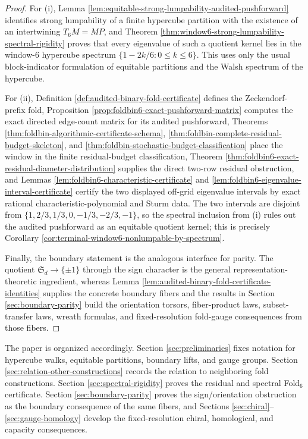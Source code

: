 \documentclass[12pt,a4paper]{article}
\theoremstyle{plain}
\theoremstyle{definition}
\numberwithin{equation}{section}
\begin{document}
\begin{proof}
For \textup{(i)}, Lemma \ref{lem:equitable-strong-lumpability-audited-pushforward} identifies strong lumpability of a finite hypercube partition with the existence of an intertwining \(T_6M=MP\), and Theorem \ref{thm:window6-strong-lumpability-spectral-rigidity} proves that every eigenvalue of such a quotient kernel lies in the window-\(6\) hypercube spectrum \(\{1-2k/6:0\le k\le6\}\).  This uses only the usual block-indicator formulation of equitable partitions and the Walsh spectrum of the hypercube.

For \textup{(ii)}, Definition \ref{def:audited-binary-fold-certificate} defines the Zeckendorf-prefix fold, Proposition \ref{prop:foldbin6-exact-pushforward-matrix} computes the exact directed edge-count matrix for its audited pushforward, Theorems \ref{thm:foldbin-algorithmic-certificate-schema}, \ref{thm:foldbin-complete-residual-budget-skeleton}, and \ref{thm:foldbin-stochastic-budget-classification} place the window in the finite residual-budget classification, Theorem \ref{thm:foldbin6-exact-residual-diameter-distribution} supplies the direct two-row residual obstruction, and Lemmas \ref{lem:foldbin6-characteristic-certificate} and \ref{lem:foldbin6-eigenvalue-interval-certificate} certify the two displayed off-grid eigenvalue intervals by exact rational characteristic-polynomial and Sturm data.  The two intervals are disjoint from \(\{1,2/3,1/3,0,-1/3,-2/3,-1\}\), so the spectral inclusion from \textup{(i)} rules out the audited pushforward as an equitable quotient kernel; this is precisely Corollary \ref{cor:terminal-window6-nonlumpable-by-spectrum}.

Finally, the boundary statement is the analogous interface for parity.  The quotient \(\mathfrak S_d\to\{\pm1\}\) through the sign character is the general representation-theoretic ingredient, whereas Lemma \ref{lem:audited-binary-fold-certificate-identities} supplies the concrete boundary fibers and the results in Section \ref{sec:boundary-parity} build the orientation torsors, fiber-product laws, subset-transfer laws, wreath formulas, and fixed-resolution fold-gauge consequences from those fibers. \qedhere
\end{proof}

The paper is organized accordingly. Section \ref{sec:preliminaries} fixes notation for hypercube walks, equitable partitions, boundary lifts, and gauge groups. Section \ref{sec:relation-other-constructions} records the relation to neighboring fold constructions. Section \ref{sec:spectral-rigidity} proves the residual and spectral Fold\(_6\) certificate. Section \ref{sec:boundary-parity} proves the sign/orientation obstruction as the boundary consequence of the same fibers, and Sections \ref{sec:chiral}--\ref{sec:gauge-homology} develop the fixed-resolution chiral, homological, and capacity consequences.
\end{document}

